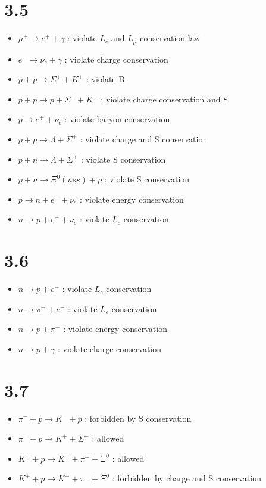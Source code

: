\documentclass{article}
\begin{document}
\begin{CJK*}{GBK}{song}
\section{3.5}
\begin{itemize}
\item $\mu^+\rightarrow e^++\gamma$  :  violate $L_e$ and $L_\mu$ conservation law
\item $e^-\rightarrow \nu_e+\gamma$  :  violate charge conservation
\item $p+p\rightarrow\Sigma^++K^+$  :  violate B
\item $p+p\rightarrow p+\Sigma^++K^-$  :  violate charge conservation and S
\item $p\rightarrow e^++\nu_e$  :  violate baryon conservation
\item $p+p\rightarrow\Lambda+\Sigma^+$  :  violate charge and S conservation 
\item $p+n\rightarrow\Lambda+\Sigma^+$  :  violate S  conservation
\item $p+n\rightarrow \Xi^0(uss)+p$ :  violate S conservation
\item $p\rightarrow n+e^++\nu_e$  :  violate energy conservation
\item $n\rightarrow p+e^-+\nu_e$  :  violate $L_e$ conservation
\end{itemize}

\section{3.6}
\begin{itemize}
\item $n\rightarrow p+e^-$  :  violate $L_e$ conservation
\item $n\rightarrow \pi^++e^-$  :  violate $L_e$ conservation
\item $n\rightarrow p+\pi^-$  :  violate energy conservation
\item $n\rightarrow p+\gamma$  :  violate charge conservation
\end{itemize}


\section{3.7}
\begin{itemize}
\item $\pi^-+p\rightarrow K^-+p$  :  forbidden by S conservation
\item $\pi^-+p\rightarrow K^++\Sigma^-$  :  allowed
\item $K^-+p\rightarrow K^++\pi^-+\Xi^0$  :  allowed
\item $K^++p\rightarrow K^-+\pi^-+\Xi^0$  :  forbidden by charge and S conservation 
\end{itemize}






\end{CJK*}
\end{document}
